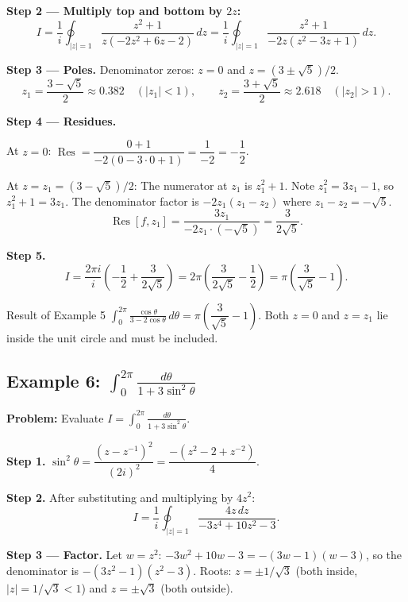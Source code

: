 \documentclass[12pt,a4paper]{article}
\begin{document}
\textbf{Step 2 --- Multiply top and bottom by $2z$:}
\[
  I = \frac{1}{i}\oint_{|z|=1}\frac{z^2+1}{z(-2z^2+6z-2)}\,dz
    = \frac{1}{i}\oint_{|z|=1}\frac{z^2+1}{-2z(z^2-3z+1)}\,dz.
\]

\textbf{Step 3 --- Poles.} Denominator zeros: $z=0$ and $z = (3\pm\sqrt{5})/2$.
\[
  z_1 = \frac{3-\sqrt{5}}{2} \approx 0.382 \quad (|z_1|<1), \qquad
  z_2 = \frac{3+\sqrt{5}}{2} \approx 2.618 \quad (|z_2|>1).
\]

\textbf{Step 4 --- Residues.}

At $z = 0$:
$\operatorname{Res} = \dfrac{0+1}{-2(0-3\cdot0+1)} = \dfrac{1}{-2} = -\dfrac{1}{2}$.

At $z = z_1 = (3-\sqrt{5})/2$:
The numerator at $z_1$ is $z_1^2 + 1$.
Note $z_1^2 = 3z_1 - 1$, so $z_1^2+1 = 3z_1$.
The denominator factor is $-2z_1(z_1 - z_2)$ where $z_1 - z_2 = -\sqrt{5}$.
\[
  \operatorname{Res}[f,z_1] = \frac{3z_1}{-2z_1 \cdot (-\sqrt{5})} = \frac{3}{2\sqrt{5}}.
\]

\textbf{Step 5.}
\[
  I = \frac{2\pi i}{i}\left(-\frac{1}{2} + \frac{3}{2\sqrt{5}}\right)
    = 2\pi\left(\frac{3}{2\sqrt{5}} - \frac{1}{2}\right)
    = \pi\left(\frac{3}{\sqrt{5}} - 1\right).
\]

\begin{learnbox}{Result of Example 5}
$\displaystyle\int_0^{2\pi}\frac{\cos\theta}{3-2\cos\theta}\,d\theta
= \pi\!\left(\dfrac{3}{\sqrt{5}}-1\right)$.
Both $z=0$ and $z=z_1$ lie inside the unit circle and must be included.
\end{learnbox}

\subsection*{Example 6: $\displaystyle\int_0^{2\pi}\frac{d\theta}{1+3\sin^2\theta}$}

\textbf{Problem:} Evaluate $I = \displaystyle\int_0^{2\pi}\frac{d\theta}{1+3\sin^2\theta}$.

\textbf{Step 1.} $\sin^2\theta = \dfrac{(z-z^{-1})^2}{(2i)^2} = \dfrac{-(z^2-2+z^{-2})}{4}$.

\textbf{Step 2.} After substituting and multiplying by $4z^2$:
\[
  I = \frac{1}{i}\oint_{|z|=1}\frac{4z\,dz}{-3z^4 + 10z^2 - 3}.
\]

\textbf{Step 3 --- Factor.} Let $w = z^2$: $-3w^2 + 10w - 3 = -(3w-1)(w-3)$,
so the denominator is $-(3z^2-1)(z^2-3)$.
Roots: $z = \pm 1/\sqrt{3}$ (both inside, $|z|=1/\sqrt{3}<1$) and
$z = \pm\sqrt{3}$ (both outside).
\end{document}
